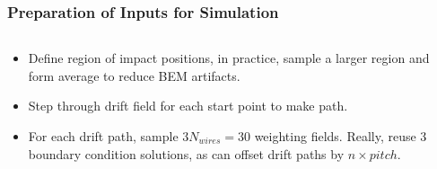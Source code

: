 \documentclass[xcolor=dvipsnames]{beamer}
\begin{document}
\begin{frame}
  \frametitle{Preparation of Inputs for Simulation}
  \begin{columns}
    \begin{column}{0.5\textwidth}
      \begin{itemize}[<+->]\footnotesize
      \item<1> Define region of impact positions, in practice, sample
        a larger region and form average to reduce BEM artifacts.
      \item<2> Step through drift field for each start point to make path.
      \item<3> For each drift path, sample $3N_{wires} = 30$ weighting fields.
        Really, reuse 3 boundary condition solutions, as can offset drift paths by $n\times pitch$.
      \end{itemize}
    \end{column}
    \begin{column}{0.5\textwidth}
    \end{column}
  \end{columns}

\end{frame}
\end{document}
